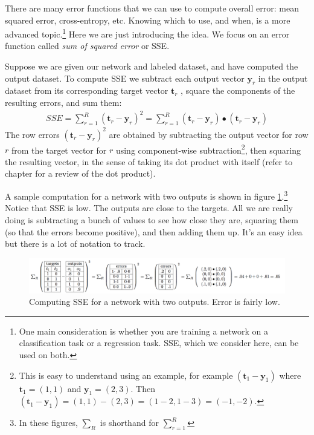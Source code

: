 There are many error functions that we can use to compute overall error: mean squared error, cross-entropy, etc. Knowing which to use, and when, is a more advanced topic.\footnote{One main consideration is whether you are training a network on a classification task or a regression task. SSE, which we consider here, can be used on both.} Here we are just introducing the idea. We focus on an error function called \emph{sum of squared error} or SSE. 

Suppose we are given our network and labeled dataset, and have computed the output dataset. To compute SSE we subtract each output vector  $\mathbf{y}_r$ in the output dataset from its corresponding target vector  $\mathbf{t}_r$ ,  square the components of the resulting errors, and sum them:
\begin{eqnarray*}
SSE = \sum_{r=1}^{R}(\mathbf{t}_r - \mathbf{y}_r)^2 =  \sum_{r=1}^{R}(\mathbf{t}_r - \mathbf{y}_r) \bullet (\mathbf{t}_r - \mathbf{y}_r) 
\end{eqnarray*}
The row errors $(\mathbf{t}_r - \mathbf{y}_r)^2$ are obtained by subtracting the output vector for row $r$ from the target vector for $r$ using component-wise subtraction\footnote{This is easy to understand using an example, for example $(\mathbf{t}_1 - \mathbf{y}_1)$ where $\mathbf{t}_1 = (1,1)$ and $\mathbf{y}_1 = (2,3)$. Then  $(\mathbf{t}_1 - \mathbf{y}_1) = (1,1) - (2,3) = (1-2,1-3) = (-1,-2)$.}, then squaring the resulting vector, in the sense of taking its dot product with itself (refer to chapter  for  a review of the dot product).

A sample computation for a network with two outputs is shown in figure \ref{error_computation2_low}.\footnote{In these figures, $\sum_R$ is shorthand for $\sum_{r=1}^{R}$} Notice that SSE is low. The outputs are close to the targets. All we are really doing is subtracting a bunch of values to see how close they are, squaring them (so that the errors become positive), and then adding them up. It's an easy idea but there is a lot of notation to track.

\begin{figure}[h]
\centering
\includegraphics[scale=.5]{./images/ErrorComputation_2_low.png}
\caption[Jeff Yoshimi.]{Computing SSE for a network with two outputs. Error is fairly low.}
\label{error_computation2_low}
\end{figure}

